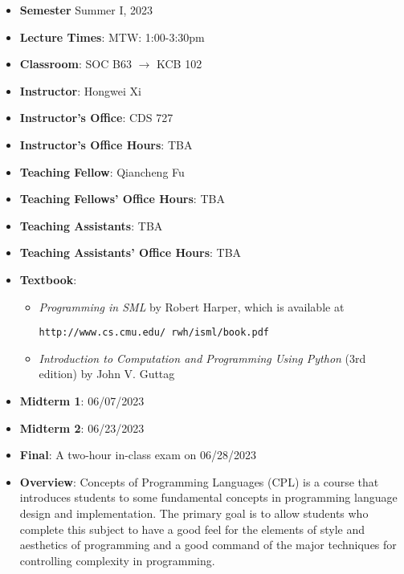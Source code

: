 \documentclass[11pt]{article}
\begin{document}
\begin{itemize}
\item {\bf Semester} Summer I, 2023

\item {\bf Lecture Times}: MTW: 1:00-3:30pm

\item {\bf Classroom}: SOC B63 $\rightarrow$ KCB 102

\item {\bf Instructor}: Hongwei Xi
\item {\bf Instructor's Office}: CDS 727
\item {\bf Instructor's Office Hours}: TBA

\item {\bf Teaching Fellow}: Qiancheng Fu
\item {\bf Teaching Fellows' Office Hours}: TBA

\item {\bf Teaching Assistants}: TBA
\item {\bf Teaching Assistants' Office Hours}: TBA

\item {\bf Textbook}:\kern6pt
\begin{itemize}
\item
{\em Programming in SML} by Robert Harper, which is available at
\begin{center}
\texttt{http://www.cs.cmu.edu/~rwh/isml/book.pdf}
\end{center}
\item
{\em Introduction to Computation and Programming Using Python} (3rd edition) by John V. Guttag
\end{itemize}

\item
{\bf Midterm 1}\kern6pt: 06/07/2023
\item
{\bf Midterm 2}\kern6pt: 06/23/2023

\item {\bf Final}:\kern6pt A two-hour in-class exam on 06/28/2023

\item {\bf Overview}:
Concepts of Programming Languages (CPL) is a course that introduces
students to some fundamental concepts in programming language design and
implementation. The primary goal is to allow students who complete this
subject to have a good feel for the elements of style and aesthetics of
programming and a good command of the major techniques for controlling
complexity in programming.


\end{itemize}
\end{document}
